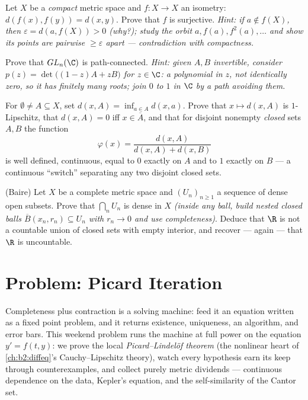 \begin{exercise}[$\star\star\star$]\label{exo:b2:metric:9}
Let $X$ be a \emph{compact} metric space and $f \colon X \to X$ an
isometry: $d(f(x), f(y)) = d(x, y)$. Prove that $f$ is surjective.
\emph{Hint: if $a \notin f(X)$, then $\varepsilon = d(a, f(X)) > 0$
(why?); study the orbit $a, f(a), f^2(a), \dots$ and show its
points are pairwise $\geq \varepsilon$ apart --- contradiction with
compactness.}
\end{exercise}

\begin{exercise}[$\star\star\star$]\label{exo:b2:metric:10}
Prove that $GL_n(\C)$ is path-connected. \emph{Hint: given $A, B$
invertible, consider $p(z) = \det\bigl((1 - z)A + zB\bigr)$ for $z
\in \C$: a polynomial in $z$, not identically zero, so it has
finitely many roots; join $0$ to $1$ in $\C$ by a path avoiding
them.}
\end{exercise}

\begin{exercise}[$\star\star$]\label{exo:b2:metric:11}
For $\emptyset \neq A \subseteq X$, set $d(x, A) = \inf_{a \in A}
d(x, a)$. Prove that $x \mapsto d(x, A)$ is $1$-Lipschitz, that
$d(x, A) = 0$ iff $x \in \overline A$, and that for disjoint
nonempty \emph{closed} sets $A, B$ the function
\[
\varphi(x) = \frac{d(x, A)}{d(x, A) + d(x, B)}
\]
is well defined, continuous, equal to $0$ exactly on $A$ and to
$1$ exactly on $B$ --- a continuous ``switch'' separating any two
disjoint closed sets.
\end{exercise}

\begin{exercise}[$\star\star\star$]\label{exo:b2:metric:12}
(Baire) Let $X$ be a complete metric space and $(U_n)_{n\geq1}$ a
sequence of dense open subsets. Prove that $\bigcap_n U_n$ is
dense in $X$ \emph{(inside any ball, build nested closed balls
$\overline B(x_n, r_n) \subseteq U_n$ with $r_n \to 0$ and use
completeness)}. Deduce that $\R$ is not a countable union of
closed sets with empty interior, and recover --- again --- that
$\R$ is uncountable.
\end{exercise}

\section{Problem: Picard Iteration}

Completeness plus contraction is a solving machine: feed it an
equation written as a fixed point problem, and it returns
existence, uniqueness, an algorithm, and error bars. This weekend
problem runs the machine at full power on the equation $y' = f(t,
y)$: we prove the local \emph{Picard--Lindel\"of theorem} (the
nonlinear heart of \cref{ch:b2:diffeq}'s Cauchy--Lipschitz
theory), watch every hypothesis earn its keep through
counterexamples, and collect purely metric dividends ---
continuous dependence on the data, Kepler's equation, and the
self-similarity of the Cantor set.

